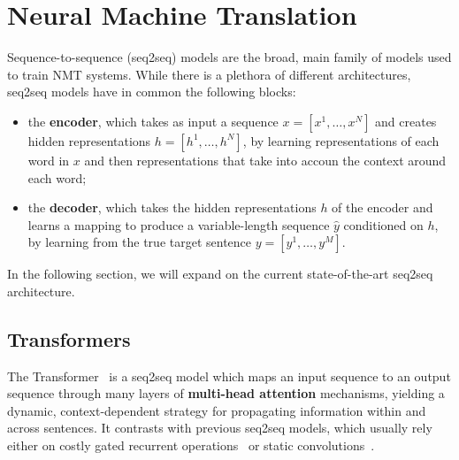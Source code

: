 \section{Neural Machine Translation}
\label{sec:nmt}

Sequence-to-sequence (seq2seq) models are the broad, main family of models
used to train NMT systems. While there is a plethora of different architectures,
seq2seq models have in common the following blocks:

\begin{itemize}
    \item the {\bf encoder}, which takes as input a sequence $x=[x^1,
    \dots, x^N]$ and creates hidden representations $h=[h^1, \dots,
    h^N]$, by learning representations of each word in $x$ and then
    representations that take into accoun the context around each word;
    \item the {\bf decoder}, which takes the hidden representations
    $h$ of the encoder and learns a mapping to produce a
    variable-length sequence $\hat{y}$ conditioned on $h$, by
    learning from the true target sentence $y=[y^1, \dots, y^M]$.
\end{itemize}

In the following section, we will expand on the current
state-of-the-art seq2seq architecture.

\subsection{Transformers}
\label{sec:transformer_bg}

The Transformer~\citep{vaswani2017attention} is a
seq2seq model which maps an input sequence to
an output sequence through many layers of \textbf{multi-head
attention} mechanisms, yielding a dynamic, context-dependent strategy
for propagating information within and across sentences. It contrasts
with previous seq2seq models, which usually rely either on costly
gated recurrent operations~\citep[often
LSTMs:][]{bahdanau2014neural,luong2015effective} or static
convolutions~\citep{convseq}.


